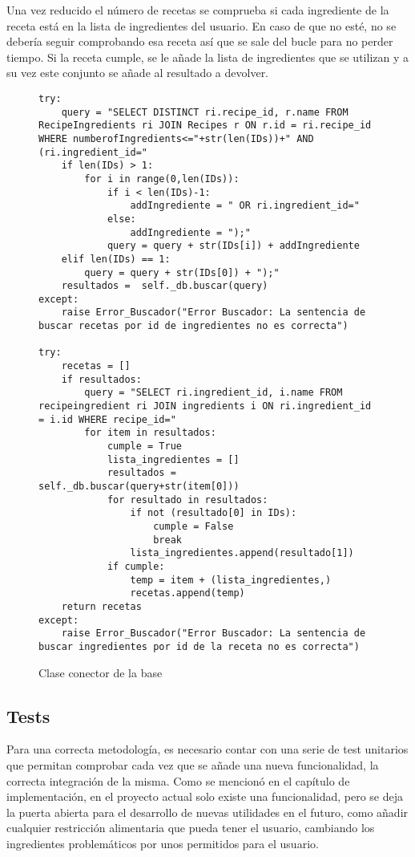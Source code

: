 Una vez reducido el número de recetas se comprueba si cada ingrediente de la receta está en la lista de ingredientes del usuario. En caso de que no esté, no se debería seguir comprobando esa receta así que se sale del bucle para no perder tiempo. Si la receta cumple, se le añade la lista de ingredientes que se utilizan y a su vez este conjunto se añade al resultado a devolver.
\begin{figure}[H!]
\begin{lstlisting}[style=C, caption={Método buscarRecetas\_Ingredientes}]
try:
    query = "SELECT DISTINCT ri.recipe_id, r.name FROM RecipeIngredients ri JOIN Recipes r ON r.id = ri.recipe_id WHERE numberofIngredients<="+str(len(IDs))+" AND (ri.ingredient_id="
    if len(IDs) > 1:
        for i in range(0,len(IDs)):
            if i < len(IDs)-1:
                addIngrediente = " OR ri.ingredient_id="
            else:
                addIngrediente = ");"
            query = query + str(IDs[i]) + addIngrediente
    elif len(IDs) == 1:
        query = query + str(IDs[0]) + ");"
    resultados =  self._db.buscar(query)
except:
    raise Error_Buscador("Error Buscador: La sentencia de buscar recetas por id de ingredientes no es correcta")
    
try:
    recetas = []
    if resultados:
        query = "SELECT ri.ingredient_id, i.name FROM recipeingredient ri JOIN ingredients i ON ri.ingredient_id = i.id WHERE recipe_id="
        for item in resultados:
            cumple = True
            lista_ingredientes = []
            resultados = self._db.buscar(query+str(item[0]))
            for resultado in resultados:
                if not (resultado[0] in IDs):
                    cumple = False
                    break
                lista_ingredientes.append(resultado[1])
            if cumple:
                temp = item + (lista_ingredientes,)
                recetas.append(temp)
    return recetas
except:
    raise Error_Buscador("Error Buscador: La sentencia de buscar ingredientes por id de la receta no es correcta")
\end{lstlisting}
    \caption{Clase conector de la \gls{base}}
    \label{cmd:sql}
\end{figure}


\subsection{Tests}
Para una correcta metodología, es necesario contar con una serie de test unitarios que permitan comprobar cada vez que se añade una nueva funcionalidad, la correcta integración de la misma. Como se mencionó en el capítulo de implementación, en el proyecto actual solo existe una funcionalidad, pero se deja la puerta abierta para el desarrollo de nuevas utilidades en el futuro, como añadir cualquier restricción alimentaria que pueda tener el usuario, cambiando los ingredientes problemáticos por unos permitidos para el usuario. 

